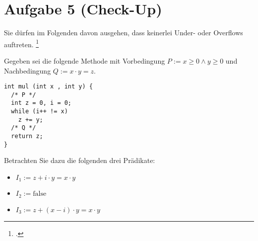 \documentclass{lehramt-informatik-aufgabe}
\begin{document}
\section{Aufgabe 5 (Check-Up)
}

Sie dürfen im Folgenden davon ausgehen, dass keinerlei Under- oder
Overflows auftreten.
\footcite[Thema 2 Teilaufgabe 2 Aufgabe 4]{examen:66116:2017:03}

Gegeben sei die folgende Methode mit Vorbedingung $P := x \geq 0 \land y
\geq 0$ und Nachbedingung $Q := x \cdot y = z$.

\begin{verbatim}
int mul (int x , int y) {
  /* P */
  int z = 0, i = 0;
  while (i++ != x)
    z += y;
  /* Q */
  return z;
}
\end{verbatim}

Betrachten Sie dazu die folgenden drei Prädikate:

\begin{itemize}
\item $I_1 := z + i \cdot y = x \cdot y$
\item $I_2 := \text{false}$
\item $I_3 := z + (x - i) \cdot y = x \cdot y$
\end{itemize}
\end{document}
